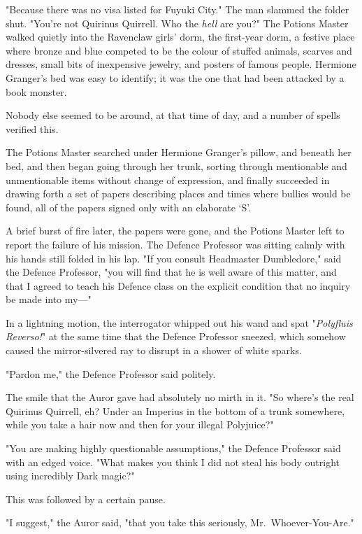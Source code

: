 "Because there was no visa listed for Fuyuki City." The man slammed the folder
shut. "You're not Quirinus Quirrell. Who the \emph{hell} are you?"
\later
The Potions Master walked quietly into the Ravenclaw girls' dorm, the
first-year dorm, a festive place where bronze and blue competed to be the
colour of stuffed animals, scarves and dresses, small bits of inexpensive
jewelry, and posters of famous people. Hermione Granger's bed was easy to
identify; it was the one that had been attacked by a book monster.

Nobody else seemed to be around, at that time of day, and a number of spells
verified this.

The Potions Master searched under Hermione Granger's pillow, and beneath her
bed, and then began going through her trunk, sorting through mentionable and
unmentionable items without change of expression, and finally succeeded in
drawing forth a set of papers describing places and times where bullies would
be found, all of the papers signed only with an elaborate `S'.

A brief burst of fire later, the papers were gone, and the Potions Master left
to report the failure of his mission.
\later
The Defence Professor was sitting calmly with his hands still folded in his
lap. "If you consult Headmaster Dumbledore," said the Defence Professor, "you
will find that he is well aware of this matter, and that I agreed to teach his
Defence class on the explicit condition that no inquiry be made into my---"

In a lightning motion, the interrogator whipped out his wand and spat
"\emph{Polyfluis Reverso!}" at the same time that the Defence Professor
sneezed, which somehow caused the mirror-silvered ray to disrupt in a shower of
white sparks.

"Pardon me," the Defence Professor said politely.

The smile that the Auror gave had absolutely no mirth in it. "So where's the
real Quirinus Quirrell, eh? Under an Imperius in the bottom of a trunk
somewhere, while you take a hair now and then for your illegal Polyjuice?"

"You are making highly questionable assumptions," the Defence Professor said
with an edged voice. "What makes you think I did not steal his body outright
using incredibly Dark magic?"

This was followed by a certain pause.

"I suggest," the Auror said, "that you take this seriously,
Mr.~Whoever-You-Are."

